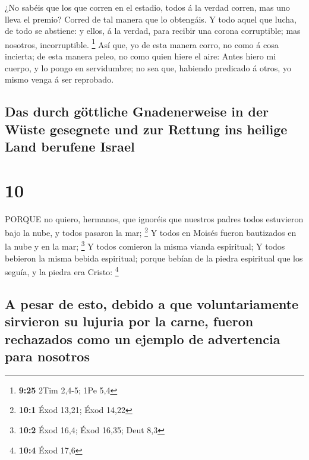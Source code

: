 ¿No sabéis que los que corren en el estadio, todos á la
verdad corren, mas uno lleva el premio? Corred de tal manera que lo
obtengáis.  Y todo aquel que lucha, de todo se abstiene: y
ellos, á la verdad, para recibir una corona corruptible; mas nosotros,
incorruptible. \footnote{\textbf{9:25} 2Tim 2,4-5; 1Pe 5,4}
 Así que, yo de esta manera corro, no como á cosa incierta;
de esta manera peleo, no como quien hiere el aire:  Antes
hiero mi cuerpo, y lo pongo en servidumbre; no sea que, habiendo
predicado á otros, yo mismo venga á ser reprobado.

\hypertarget{das-durch-guxf6ttliche-gnadenerweise-in-der-wuxfcste-gesegnete-und-zur-rettung-ins-heilige-land-berufene-israel}{%
\subsection{Das durch göttliche Gnadenerweise in der Wüste gesegnete und
zur Rettung ins heilige Land berufene
Israel}\label{das-durch-guxf6ttliche-gnadenerweise-in-der-wuxfcste-gesegnete-und-zur-rettung-ins-heilige-land-berufene-israel}}

\hypertarget{section-9}{%
\section{10}\label{section-9}}

 PORQUE no quiero, hermanos, que ignoréis que nuestros
padres todos estuvieron bajo la nube, y todos pasaron la mar;
\footnote{\textbf{10:1} Éxod 13,21; Éxod 14,22}  Y todos en
Moisés fueron bautizados en la nube y en la mar; \footnote{\textbf{10:2}
  Éxod 16,4; Éxod 16,35; Deut 8,3}  Y todos comieron la
misma vianda espiritual;  Y todos bebieron la misma bebida
espiritual; porque bebían de la piedra espiritual que los seguía, y la
piedra era Cristo: \footnote{\textbf{10:4} Éxod 17,6}

\hypertarget{a-pesar-de-esto-debido-a-que-voluntariamente-sirvieron-su-lujuria-por-la-carne-fueron-rechazados-como-un-ejemplo-de-advertencia-para-nosotros}{%
\subsection{A pesar de esto, debido a que voluntariamente sirvieron su
lujuria por la carne, fueron rechazados como un ejemplo de advertencia
para
nosotros}\label{a-pesar-de-esto-debido-a-que-voluntariamente-sirvieron-su-lujuria-por-la-carne-fueron-rechazados-como-un-ejemplo-de-advertencia-para-nosotros}}

